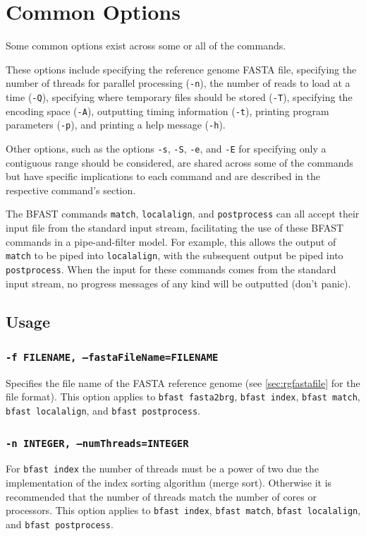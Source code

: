 \documentclass[a4paper,12pt]{book}
\newcommand{\TT}[1]{{\tt #1}} %
\begin{document}
\section{Common Options}
\label{sec:commonoptions}
Some common options exist across some or all of the commands. 

These options include specifying the reference genome FASTA file, specifying the number of threads for parallel processing (\TT{-n}), the number of reads to load at a time (\TT{-Q}), specifying where temporary files should be stored (\TT{-T}), specifying the encoding space (\TT{-A}), outputting timing information (\TT{-t}), printing program parameters (\TT{-p}), and printing a help message (\TT{-h}).

Other options, such as the options \TT{-s}, \TT{-S}, \TT{-e}, and \TT{-E} for specifying only a contiguous range should be considered, are shared across some of the commands but have specific implications to each command and are described in the respective command's section.

The BFAST commands \TT{match}, \TT{localalign}, and \TT{postprocess} can all accept their input file from the standard input stream, facilitating the use of these BFAST commands in a pipe-and-filter model.
For example, this allows the output of \TT{match} to be piped into \TT{localalign}, with the subsequent output be piped into \TT{postprocess}. 
When the input for these commands comes from the standard input stream, no progress messages of any kind will be outputted (don't panic).

\subsection{Usage}
\subsubsection{\TT{-f FILENAME, --fastaFileName=FILENAME}}
Specifies the file name of the FASTA reference genome (see \autoref{sec:rgfastafile} for the file format).
This option applies to \TT{bfast fasta2brg}, \TT{bfast index}, \TT{bfast match}, \TT{bfast localalign}, and \TT{bfast postprocess}.
\subsubsection{\TT{-n INTEGER, --numThreads=INTEGER}}
For \TT{bfast index} the number of threads must be a power of two due the implementation of the index sorting algorithm (merge sort).
Otherwise it is recommended that the number of threads match the number of cores or processors.
This option applies to \TT{bfast index}, \TT{bfast match}, \TT{bfast localalign}, and \TT{bfast postprocess}. 
\end{document}
